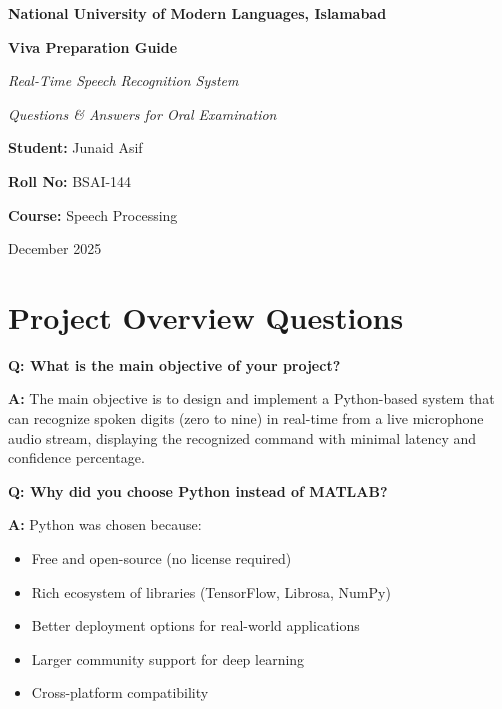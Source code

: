 \documentclass[a4paper,12pt]{article}
\newcommand{\vivaQ}[1]{\textcolor{questioncolor}{\textbf{Q: #1}}}
\newcommand{\vivaA}[1]{\textcolor{answercolor}{\textbf{A:}} #1}
\begin{document}
\begin{titlepage}
    \centering
    {\Large \textbf{National University of Modern Languages, Islamabad}} \par
    \vspace{2cm}
    {\Huge \bfseries Viva Preparation Guide \par}
    \vspace{1cm}
    {\Large \textit{Real-Time Speech Recognition System} \par}
    \vspace{0.5cm}
    {\large \textit{Questions \& Answers for Oral Examination} \par}
    \vspace{3cm}
    {\large \textbf{Student:} Junaid Asif} \par
    \vspace{0.3cm}
    {\large \textbf{Roll No:} BSAI-144} \par
    \vspace{0.3cm}
    {\large \textbf{Course:} Speech Processing} \par
    \vfill
    {\large December 2025}
\end{titlepage}


\tableofcontents
\newpage

\section{Project Overview Questions}

\vivaQ{What is the main objective of your project?}

\vivaA{The main objective is to design and implement a Python-based system that can recognize spoken digits (zero to nine) in real-time from a live microphone audio stream, displaying the recognized command with minimal latency and confidence percentage.}

\vspace{0.5cm}

\vivaQ{Why did you choose Python instead of MATLAB?}

\vivaA{Python was chosen because:
\begin{itemize}
    \item Free and open-source (no license required)
    \item Rich ecosystem of libraries (TensorFlow, Librosa, NumPy)
    \item Better deployment options for real-world applications
    \item Larger community support for deep learning
    \item Cross-platform compatibility
\end{itemize}}
\end{document}
